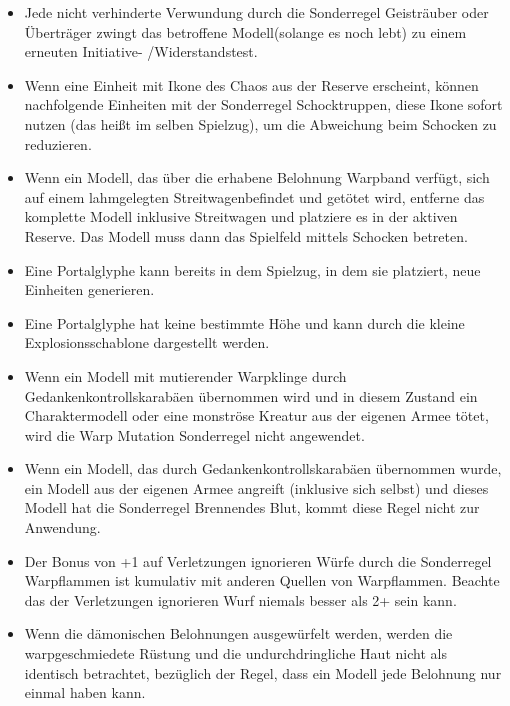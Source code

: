 \begin{itemize}
 \item Jede nicht verhinderte Verwundung durch die Sonderregel Geisträuber oder
  Überträger zwingt das betroffene Modell(solange es noch lebt) zu einem
  erneuten Initiative- /Widerstandstest.

 \item Wenn eine Einheit mit Ikone des Chaos aus der Reserve erscheint, können
  nachfolgende Einheiten mit der Sonderregel Schocktruppen, diese Ikone sofort
  nutzen (das heißt im selben Spielzug), um die Abweichung beim Schocken zu
  reduzieren.

 \item Wenn ein Modell, das über die erhabene Belohnung Warpband verfügt, sich
  auf einem lahmgelegten Streitwagenbefindet und getötet wird, entferne das
  komplette Modell inklusive Streitwagen und platziere es in der aktiven
  Reserve. Das Modell muss dann das Spielfeld mittels Schocken betreten.

 \item Eine Portalglyphe kann bereits in dem Spielzug, in dem sie platziert,
  neue Einheiten generieren.

 \item Eine Portalglyphe hat keine bestimmte Höhe und kann durch die kleine
  Explosionsschablone dargestellt werden.

 \item Wenn ein Modell mit mutierender Warpklinge durch
  Gedankenkontrollskarabäen übernommen wird und in diesem Zustand ein
  Charaktermodell oder eine monströse Kreatur aus der eigenen Armee tötet, wird
  die Warp Mutation Sonderregel nicht angewendet.

 \item Wenn ein Modell, das durch Gedankenkontrollskarabäen übernommen wurde,
  ein Modell aus der eigenen Armee angreift (inklusive sich selbst) und dieses
  Modell hat die Sonderregel Brennendes Blut, kommt diese Regel nicht zur
  Anwendung.

 \item Der Bonus von +1 auf Verletzungen ignorieren Würfe durch die Sonderregel
  Warpflammen ist kumulativ mit anderen Quellen von Warpflammen. Beachte das der
  Verletzungen ignorieren Wurf niemals besser als 2+ sein kann.

 \item Wenn die dämonischen Belohnungen ausgewürfelt werden, werden die
  warpgeschmiedete Rüstung und die undurchdringliche Haut nicht als identisch
  betrachtet, bezüglich der Regel, dass ein Modell jede Belohnung nur einmal
  haben kann.


\end{itemize}
